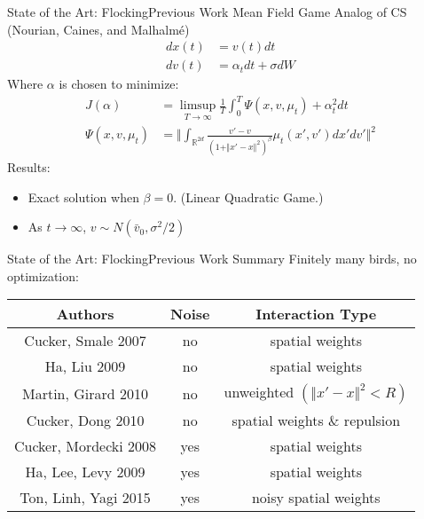 \documentclass{beamer}
\begin{document}
\begin{frame}{State of the Art: Flocking}{Previous Work}
	Mean Field Game Analog of CS (Nourian, Caines, and Malhalm\'{e})
				\begin{equation}
				\begin{split}
				dx(t)&=v(t)dt\\
				dv(t)&=\alpha_tdt+\sigma dW
				\end{split}
				\end{equation}
				Where $\alpha$ is chosen to minimize:
				\begin{equation}
				\begin{split}
				J(\alpha)&=\limsup_{T \rightarrow \infty} \frac{1}{T} \int_0^T \Psi(x,v,\mu_t)+\alpha_t^2 dt \\
				\Psi(x,v,\mu_t)&=\Vert\int_{\mathbb{R}^{2d}}\frac{v'-v}{(1+\Vert x'-x \Vert^2)^\beta}\mu_t(x',v')dx'dv' \Vert^2
				\end{split}
				\end{equation}
	Results:
	\begin{itemize}
		\item {
			Exact solution when $\beta=0$. (Linear Quadratic Game.)
		}
		\item {
			As $t\rightarrow \infty$, $v \sim N(\bar{v}_0,\sigma^2/2)$
		}
	\end{itemize}
\end{frame}

\begin{frame}{State of the Art: Flocking}{Previous Work Summary}
	Finitely many birds, no optimization:
	\begin{center}
	\begin{tabular}{|c|c|c|}
	 \hline
	 Authors & Noise & Interaction Type  \\ \hline
	 Cucker, Smale 2007& no & spatial weights \\ \hline
	 Ha, Liu 2009& no&spatial weights \\ \hline
	 Martin, Girard 2010 & no&unweighted $(\Vert x'-x\Vert^2 <R)$ \\ \hline
	 Cucker, Dong 2010 & no&spatial weights \& repulsion \\ \hline
	 Cucker, Mordecki 2008 & yes&spatial weights \\ \hline
	 Ha, Lee, Levy 2009 & yes&spatial weights \\ \hline
	 Ton, Linh, Yagi 2015 & yes& noisy spatial weights \\
	 \hline
	\end{tabular}
	\end{center}
\end{frame}
\end{document}
